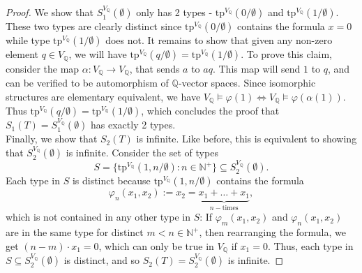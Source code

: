 \documentclass{article}
\begin{document}
\begin{enumerate}[label={\bf Q\arabic*:}]
\begin{proof}
      We show that $S_1^{V_{\mathbb{Q}}}(\emptyset)$ only has 2 types -
      $\text{tp}^{V_{\mathbb{Q}}}(0/\emptyset)$ and
      $\text{tp}^{V_{\mathbb{Q}}}(1/\emptyset)$. These two types are
      clearly distinct since $\text{tp}^{V_{\mathbb{Q}}}(0/\emptyset)$
      contains the formula $x=0$ while type
      $\text{tp}^{V_{\mathbb{Q}}}(1/\emptyset)$ does not. It remains to
      show that given any non-zero element $q\in V_\mathbb{Q}$, we will
      have $\text{tp}^{V_{\mathbb{Q}}}(q/\emptyset)=
      \text{tp}^{V_{\mathbb{Q}}}(1/\emptyset)$. To prove this claim,
      consider the map $\alpha:V_{\mathbb{Q}}\rightarrow V_{\mathbb{Q}}$,
      that sends $a$ to $aq$. This map will send $1$ to $q$, and can be
      verified to be automorphism of $\mathbb{Q}$-vector spaces. Since
      isomorphic structures are elementary equivalent, we have
      $V_\mathbb{Q}\models\varphi(1)\Leftrightarrow
      V_\mathbb{Q}\models\varphi(\alpha(1))$. Thus
      $\text{tp}^{V_{\mathbb{Q}}}(q/\emptyset)=
      \text{tp}^{V_{\mathbb{Q}}}(1/\emptyset)$, which concludes the proof
      that $S_1(T)=S_1^{V_{\mathbb{Q}}}(\emptyset)$ has exactly 2 types. \\

      Finally, we show that $S_2(T)$ is infinite. Like before, this is
      equivalent to showing that $S_2^{V_{\mathbb{Q}}}(\emptyset)$ is
      infinite. Consider the set of types
      \[S=\{\text{tp}^{V_\mathbb{Q}}(1,n/\emptyset): n\in\mathbb{N}^+\}
      \subseteq S_2^{V_{\mathbb{Q}}}(\emptyset).\] Each type in $S$ is
      distinct because $\text{tp}^{V_\mathbb{Q}}(1,n/\emptyset)$ contains
      the formula \[\varphi_n(x_1,x_2):=
      x_2=\underbrace{x_1+\ldots+x_1}_{n-\text{times}},\] which is not
      contained in any other type in $S$: If $\varphi_m(x_1,x_2)$ and
      $\varphi_n(x_1,x_2)$ are in the same type for distinct
      $m<n\in\mathbb{N}^+$, then rearranging the formula, we get
      $(n-m)\cdot x_1=0$, which can only be true in $V_\mathbb{Q}$ if
      $x_1=0$. Thus, each type in $S\subseteq S_2^{V_\mathbb{Q}}(\emptyset)$
      is distinct, and so $S_2(T)=S_2^{V_\mathbb{Q}}(\emptyset)$ is
      infinite.
    \end{proof}
\end{enumerate}
\end{document}

